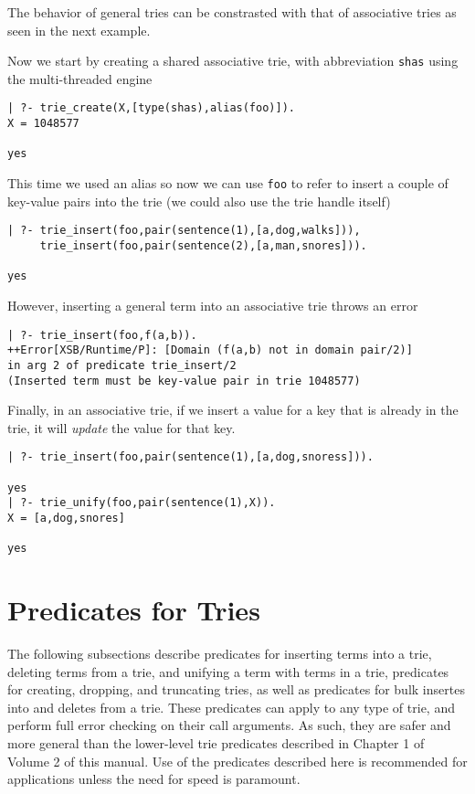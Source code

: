 The behavior of general tries can be constrasted with that of
associative tries as seen in the next example.
\begin{example} \rm
Now we start by creating a shared associative trie, with abbreviation
{\tt shas} using the multi-threaded engine
{\small
\begin{verbatim}
| ?- trie_create(X,[type(shas),alias(foo)]).
X = 1048577

yes
\end{verbatim}
}  \noindent
%
This time we used an alias so now we can use {\tt foo} to refer to
insert a couple of key-value pairs into the trie (we could also use
the trie handle itself) 
{\small
\begin{verbatim}
| ?- trie_insert(foo,pair(sentence(1),[a,dog,walks])), 
     trie_insert(foo,pair(sentence(2),[a,man,snores])).

yes
\end{verbatim}
} \noindent
However, inserting a general term into an associative trie throws an
error
{\small
\begin{verbatim}
| ?- trie_insert(foo,f(a,b)).
++Error[XSB/Runtime/P]: [Domain (f(a,b) not in domain pair/2)]  
in arg 2 of predicate trie_insert/2 
(Inserted term must be key-value pair in trie 1048577)
\end{verbatim}
}  \noindent
Finally, in an associative trie, if we insert a value for a key that
is already in the trie, it will {\em update} the value for that key.
{\small
\begin{verbatim}
| ?- trie_insert(foo,pair(sentence(1),[a,dog,snoress])).

yes
| ?- trie_unify(foo,pair(sentence(1),X)).
X = [a,dog,snores]

yes
\end{verbatim}
}

\end{example}

\section{Predicates for Tries} 
%
The following subsections describe predicates for inserting terms into
a trie, deleting terms from a trie, and unifying a term with terms in
a trie, predicates for creating, dropping, and truncating tries, as
well as predicates for bulk insertes into and deletes from a trie.
These predicates can apply to any type of trie, and perform full error
checking on their call arguments.  As such, they are safer and more
general than the lower-level trie predicates described in Chapter 1 of
Volume 2 of this manual.  Use of the predicates described here is
recommended for applications unless the need for speed is paramount.

